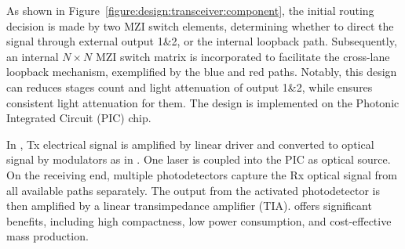  As shown in Figure~\ref{figure:design:transceiver:component}, the initial routing decision is made by two MZI switch elements, determining whether to direct the signal through external output 1\&2, or the internal loopback path.
Subsequently, an internal $N\times N$ MZI switch matrix is incorporated to facilitate the cross-lane loopback mechanism, exemplified by the blue and red paths.  Notably, this design can reduces stages count and light attenuation of output 1\&2, while ensures consistent light attenuation for them. The design is implemented on the Photonic Integrated Circuit (PIC) chip.

 In \ocstrx, Tx electrical signal is amplified by linear driver and converted to optical signal by modulators as in . One laser is coupled into the PIC as optical source.
On the receiving end, multiple photodetectors capture the Rx optical signal from all available paths separately. The output from the activated photodetector is then amplified by a linear transimpedance amplifier (TIA).
\ocstrx{} offers significant benefits, including high compactness, low power consumption, and cost-effective mass production.













